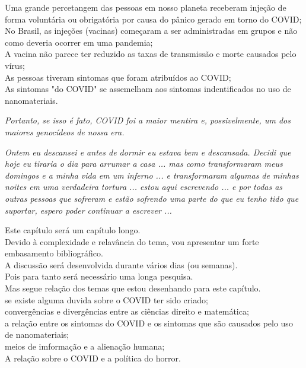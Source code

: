 \documentclass[11pt]{book}
\begin{document}
Uma grande percetangem das pessoas em nosso planeta receberam injeção de forma voluntária ou obrigatória por causa do pânico gerado em torno do COVID; \\

No Brasil, as injeções (vacinas) começaram a ser administradas em grupos e não como deveria ocorrer em uma pandemia; \\

A vacina não parece ter reduzido as taxas de transmissão e morte causados pelo vírus; \\

As pessoas tiveram sintomas que foram atribuídos ao COVID; \\

As sintomas "do COVID" se assemelham aos sintomas indentificados no uso de nanomateriais. \\


\noindent \begin{center} \emph{Portanto, se isso é fato, COVID foi a maior mentira e, possivelmente, um dos maiores genocídeos de nossa era.} \end{center}

\noindent \begin{center} \emph{Ontem eu descansei e antes de dormir eu estava bem e descansada. Decidi que hoje eu tiraria o dia para arrumar a casa ... mas como transformaram meus domingos e a minha vida em um inferno ... e transformaram algumas de minhas noites em uma verdadeira tortura ... estou aqui escrevendo ... e por todas as outras pessoas que sofreram e estão sofrendo uma parte do que eu tenho tido que suportar, espero poder continuar a escrever ...} \end{center}

Este capítulo será um capítulo longo. \\
Devido à complexidade e relavância do tema, vou apresentar um forte embasamento bibliográfico. \\
A discussão será desenvolvida durante vários dias (ou semanas). \\
Pois para tanto será necessário uma longa pesquisa. \\

Mas segue relação dos temas que estou desenhando para este capítulo. \\

se existe alguma duvida sobre o COVID ter sido criado; \\
convergências e divergências entre as ciências direito e matemática; \\
a relação entre os sintomas do COVID e os sintomas que são causados pelo uso de nanomateriais; \\
meios de imformação e a alienação humana; \\
A relação sobre o COVID e a política do horror. \\
\end{document}
